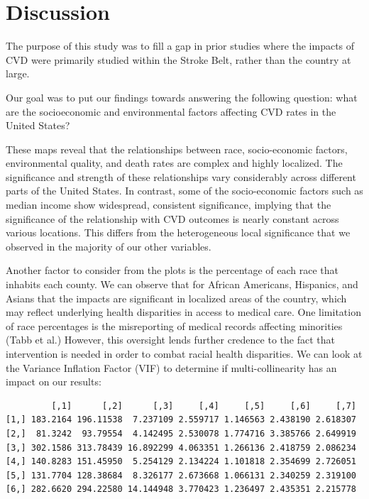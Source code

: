 \documentclass[
]{article}
\begin{document}
\section{Discussion}\label{discussion}

The purpose of this study was to fill a gap in prior studies where the
impacts of CVD were primarily studied within the Stroke Belt, rather
than the country at large.

Our goal was to put our findings towards answering the following
question: what are the socioeconomic and environmental factors affecting
CVD rates in the United States?

These maps reveal that the relationships between race, socio-economic
factors, environmental quality, and death rates are complex and highly
localized. The significance and strength of these relationships vary
considerably across different parts of the United States. In contrast,
some of the socio-economic factors such as median income show
widespread, consistent significance, implying that the significance of
the relationship with CVD outcomes is nearly constant across various
locations. This differs from the heterogeneous local significance that
we observed in the majority of our other variables.

Another factor to consider from the plots is the percentage of each race
that inhabits each county. We can observe that for African Americans,
Hispanics, and Asians that the impacts are significant in localized
areas of the country, which may reflect underlying health disparities in
access to medical care. One limitation of race percentages is the
misreporting of medical records affecting minorities (Tabb et al.)
However, this oversight lends further credence to the fact that
intervention is needed in order to combat racial health disparities. We
can look at the Variance Inflation Factor (VIF) to determine if
multi-collinearity has an impact on our results:

\begin{verbatim}
         [,1]      [,2]      [,3]     [,4]     [,5]     [,6]     [,7]
[1,] 183.2164 196.11538  7.237109 2.559717 1.146563 2.438190 2.618307
[2,]  81.3242  93.79554  4.142495 2.530078 1.774716 3.385766 2.649919
[3,] 302.1586 313.78439 16.892299 4.063351 1.266136 2.418759 2.086234
[4,] 140.8283 151.45950  5.254129 2.134224 1.101818 2.354699 2.726051
[5,] 131.7704 128.38684  8.326177 2.673668 1.066131 2.340259 2.319100
[6,] 282.6620 294.22580 14.144948 3.770423 1.236497 2.435351 2.215778
\end{verbatim}
\end{document}
